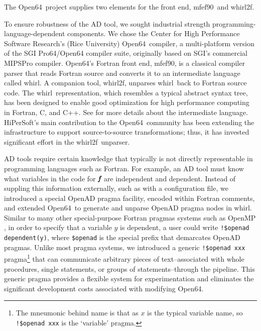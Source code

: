 \documentclass[11pt]{article}
\newcommand{\mfefninety}{mfef90}
\newcommand{\OpenSixtyFour}{Open64}
\newcommand{\whirl}{whirl}
\newcommand{\whirlTof}{whirl2f}
\newcommand{\bmf}{\mbox{\bf\em f}}
\newcommand{\code}[1]{{\small\tt{#1}}}
\begin{document}
The \OpenSixtyFour\ project \cite{open64Web} supplies two elements for
the front end, \mfefninety\ and \whirlTof.

To ensure robustness of the AD tool, we sought industrial strength
programming-language-dependent components.  We chose the Center for
High Performance Software Research's (Rice University) \OpenSixtyFour\
compiler, a multi-platform version of the SGI Pro64/Open64 compiler
suite, originally based on SGI's commercial MIPSPro compiler.
\OpenSixtyFour's Fortran front end, \mfefninety, is a classical
compiler parser that reads Fortran source and converts it to an
intermediate language called \whirl.  A companion tool, \whirlTof,
unparses \whirl\ back to Fortran source code.  The \whirl\
representation, which resembles a typical abstract syntax tree, has
been designed to enable good optimization for high performance
computing in Fortran, C, and C++. See \cite{open64Web} for more
details about the intermediate language.  HiPerSoft's main
contribution to the \OpenSixtyFour\ community has been extending the
infrastructure to support source-to-source transformations; thus, it
has invested significant effort in the \whirlTof\ unparser.

AD tools require certain knowledge that typically is not directly
representable in programming languages such as Fortran.  For example,
an AD tool must know what variables in the code for $\bmf$ are
independent and dependent.  Instead of suppling this information
externally, such as with a configuration file, we introduced a special
OpenAD pragma facility, encoded within Fortran comments, and extended
\OpenSixtyFour\ to generate and unparse OpenAD pragma nodes in \whirl.
Similar to many other special-purpose Fortran pragmas systems such as
OpenMP \cite{OpenMP-website}, in order to specify that a variable
$y$ is dependent, a user could write \code{!\$openad dependent(y)},
where \code{\$openad} is the special prefix that demarcates OpenAD
pragmas.  Unlike most pragma systems, we introduced a generic
\code{!\$openad xxx} pragma\footnote{The mneumonic behind name is that
  as $x$ is the typical variable name, so \code{!\$openad xxx} is the
  `variable' pragma.} that can communicate arbitrary pieces of
text--associated with whole procedures, single statements, or groups
of statements--through the pipeline.  This generic pragma provides a
flexible system for experimentation and eliminates the significant
development costs associated with modifying \OpenSixtyFour.


\end{document}
